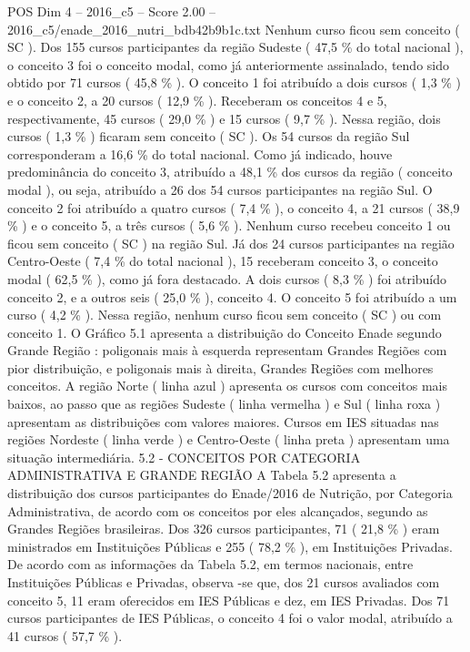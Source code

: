 \begin{textsample}{POS Dim 4 – 2016\_c5 – Score 2.00 – 2016\_c5/enade\_2016\_nutri\_bdb42b9b1c.txt}
Nenhum curso ficou sem conceito ( SC ).
Dos 155 cursos participantes da região Sudeste ( 47,5 \% do total nacional ), o conceito 3 foi o conceito modal, como já anteriormente assinalado, tendo sido obtido por 71 cursos ( 45,8 \% ).
O conceito 1 foi atribuído a dois cursos ( 1,3 \% ) e o conceito 2, a 20 cursos ( 12,9 \% ).
Receberam os conceitos 4 e 5, respectivamente, 45 cursos ( 29,0 \% ) e 15 cursos ( 9,7 \% ).
Nessa região, dois cursos ( 1,3 \% ) ficaram sem conceito ( SC ).
Os 54 cursos da região Sul corresponderam a 16,6 \% do total nacional.
Como já indicado, houve predominância do conceito 3, atribuído a 48,1 \% dos cursos da região ( conceito modal ), ou seja, atribuído a 26 dos 54 cursos participantes na região Sul.
O conceito 2 foi atribuído a quatro cursos ( 7,4 \% ), o conceito 4, a 21 cursos ( 38,9 \% ) e o conceito 5, a três cursos ( 5,6 \% ).
Nenhum curso recebeu conceito 1 ou ficou sem conceito ( SC ) na região Sul.
Já dos 24 cursos participantes na região Centro-Oeste ( 7,4 \% do total nacional ), 15 receberam conceito 3, o conceito modal ( 62,5 \% ), como já fora destacado.
A dois cursos ( 8,3 \% ) foi atribuído conceito 2, e a outros seis ( 25,0 \% ), conceito 4.
O conceito 5 foi atribuído a um curso ( 4,2 \% ).
Nessa região, nenhum curso ficou sem conceito ( SC ) ou com conceito 1.
O Gráfico 5.1 apresenta a distribuição do Conceito Enade segundo Grande Região : poligonais mais à esquerda representam Grandes Regiões com pior distribuição, e poligonais mais à direita, Grandes Regiões com melhores conceitos.
A região Norte ( linha azul ) apresenta os cursos com conceitos mais baixos, ao passo que as regiões Sudeste ( linha vermelha ) e Sul ( linha roxa ) apresentam as distribuições com valores maiores.
Cursos em IES situadas nas regiões Nordeste ( linha verde ) e Centro-Oeste ( linha preta ) apresentam uma situação intermediária. 5.2 - CONCEITOS POR CATEGORIA ADMINISTRATIVA E GRANDE REGIÃO A Tabela 5.2 apresenta a distribuição dos cursos participantes do Enade/2016 de Nutrição, por Categoria Administrativa, de acordo com os conceitos por eles alcançados, segundo as Grandes Regiões brasileiras.
Dos 326 cursos participantes, 71 ( 21,8 \% ) eram ministrados em Instituições Públicas e 255 ( 78,2 \% ), em Instituições Privadas.
De acordo com as informações da Tabela 5.2, em termos nacionais, entre Instituições Públicas e Privadas, observa -se que, dos 21 cursos avaliados com conceito 5, 11 eram oferecidos em IES Públicas e dez, em IES Privadas.
Dos 71 cursos participantes de IES Públicas, o conceito 4 foi o valor modal, atribuído a 41 cursos ( 57,7 \% ).

\end{textsample}
